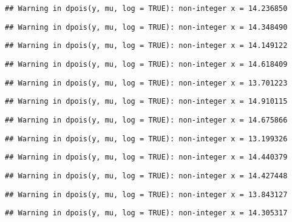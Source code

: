 \documentclass[
]{article}
\begin{document}
\begin{verbatim}
## Warning in dpois(y, mu, log = TRUE): non-integer x = 14.236850
\end{verbatim}

\begin{verbatim}
## Warning in dpois(y, mu, log = TRUE): non-integer x = 14.348490
\end{verbatim}

\begin{verbatim}
## Warning in dpois(y, mu, log = TRUE): non-integer x = 14.149122
\end{verbatim}

\begin{verbatim}
## Warning in dpois(y, mu, log = TRUE): non-integer x = 14.618409
\end{verbatim}

\begin{verbatim}
## Warning in dpois(y, mu, log = TRUE): non-integer x = 13.701223
\end{verbatim}

\begin{verbatim}
## Warning in dpois(y, mu, log = TRUE): non-integer x = 14.910115
\end{verbatim}

\begin{verbatim}
## Warning in dpois(y, mu, log = TRUE): non-integer x = 14.675866
\end{verbatim}

\begin{verbatim}
## Warning in dpois(y, mu, log = TRUE): non-integer x = 13.199326
\end{verbatim}

\begin{verbatim}
## Warning in dpois(y, mu, log = TRUE): non-integer x = 14.440379
\end{verbatim}

\begin{verbatim}
## Warning in dpois(y, mu, log = TRUE): non-integer x = 14.427448
\end{verbatim}

\begin{verbatim}
## Warning in dpois(y, mu, log = TRUE): non-integer x = 13.843127
\end{verbatim}

\begin{verbatim}
## Warning in dpois(y, mu, log = TRUE): non-integer x = 14.305317
\end{verbatim}
\end{document}
